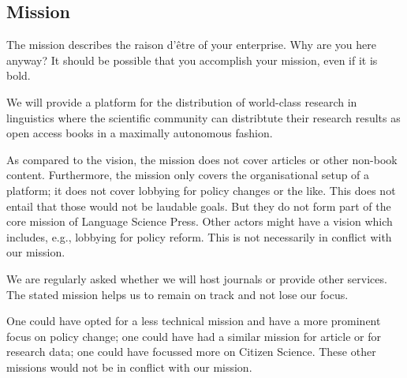 \documentclass[nonflat,smallfont
]{langsci/langscibook}
\newcommand{\background}[1]{ 
  \vspace{5mm}
  \renewcommand{\tblslinecolour}{lsDarkBlue}
  \tblssy[red]{explore2}{Background}{\vspace*{-5mm}#1}
}
\newcommand{\langscisolution}[1]{
  \renewcommand{\tblslinecolour}{lsLightBlue}
  \tblssy{langsci}{LangSci solution}{\vspace*{-5mm}#1}
}
\newcommand{\evaluation}[1]{
  \renewcommand{\tblslinecolour}{lsLightOrange}
  \tblssy{receipt}{Evaluation}{\vspace*{-5mm}#1}
}
\newcommand{\othersolutions}[1]{
  \renewcommand{\tblslinecolour}{lsDarkGreenOne}
  \tblssy{more}{Other solutions}{\vspace*{-5mm}#1}
}
\renewcommand{\tblssy}[4][black!12]{%
  \renewcommand{\langscisymbol}{#2}\renewcommand{\tblsboxcolor}{#1}
  \begin{mdframed}[style=yellowexercise,frametitle={#3}]
    #4
  \end{mdframed}
}
\begin{document}
\subsection{Mission}
\vspace*{5mm}\background{The mission describes the raison d'être of your enterprise. Why are you here anyway? It should be possible that you accomplish your mission, even if it is bold.}
\langscisolution{ 
We will provide a platform for the distribution of world-class research in linguistics where the scientific community can distribtute their research results as open access books in a maximally autonomous fashion.
}
\evaluation{
As compared to the vision, the mission does not cover articles or other non-book content. Furthermore, the mission only covers the organisational setup of a platform; it does not cover lobbying for policy changes or the like. This does not entail that those would not be laudable goals. But they do not form part of the core mission of Language Science Press. Other actors might have a vision which includes, e.g., lobbying for policy reform. This is not necessarily in conflict with our mission.

We are regularly asked whether we will host journals or provide other services. The stated mission helps us to remain on track and not lose our focus.}
\othersolutions{One could have opted for a less technical mission and have a more prominent focus on policy change; one could have had a similar mission for article or for research data; one could have focussed more on Citizen Science. These other missions would not be in conflict with our mission. } 

\newpage 
\end{document}
